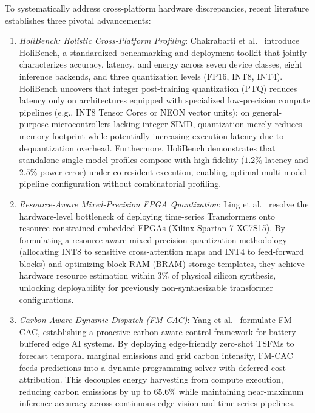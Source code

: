 To systematically address cross-platform hardware discrepancies, recent literature establishes three pivotal advancements:
\begin{enumerate}[leftmargin=*]
    \item \emph{HoliBench: Holistic Cross-Platform Profiling}: Chakrabarti et al.~\cite{chakrabarti2026holibench} introduce HoliBench, a standardized benchmarking and deployment toolkit that jointly characterizes accuracy, latency, and energy across seven device classes, eight inference backends, and three quantization levels (FP16, INT8, INT4). HoliBench uncovers that integer post-training quantization (PTQ) reduces latency only on architectures equipped with specialized low-precision compute pipelines (e.g., INT8 Tensor Cores or NEON vector units); on general-purpose microcontrollers lacking integer SIMD, quantization merely reduces memory footprint while potentially increasing execution latency due to dequantization overhead. Furthermore, HoliBench demonstrates that standalone single-model profiles compose with high fidelity ($1.2\%$ latency and $2.5\%$ power error) under co-resident execution, enabling optimal multi-model pipeline configuration without combinatorial profiling.
    \item \emph{Resource-Aware Mixed-Precision FPGA Quantization}: Ling et al.~\cite{ling2024resource} resolve the hardware-level bottleneck of deploying time-series Transformers onto resource-constrained embedded FPGAs (Xilinx Spartan-7 XC7S15). By formulating a resource-aware mixed-precision quantization methodology (allocating INT8 to sensitive cross-attention maps and INT4 to feed-forward blocks) and optimizing block RAM (BRAM) storage templates, they achieve hardware resource estimation within $3\%$ of physical silicon synthesis, unlocking deployability for previously non-synthesizable transformer configurations.
    \item \emph{Carbon-Aware Dynamic Dispatch (FM-CAC)}: Yang et al.~\cite{yang2026fmcac} formulate FM-CAC, establishing a proactive carbon-aware control framework for battery-buffered edge AI systems. By deploying edge-friendly zero-shot TSFMs to forecast temporal marginal emissions and grid carbon intensity, FM-CAC feeds predictions into a dynamic programming solver with deferred cost attribution. This decouples energy harvesting from compute execution, reducing carbon emissions by up to $65.6\%$ while maintaining near-maximum inference accuracy across continuous edge vision and time-series pipelines.
\end{enumerate}

